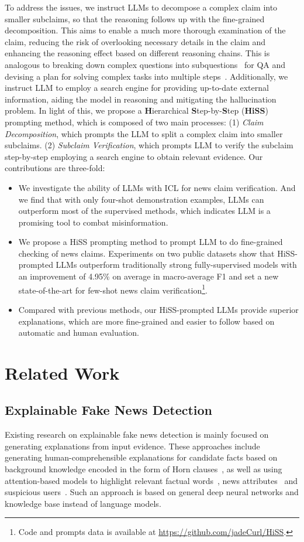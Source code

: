 \documentclass[11pt]{article}
\begin{document}
To address the issues, we instruct LLMs to decompose a complex claim into smaller subclaims, so that the reasoning follows up with the fine-grained decomposition. This aims to enable a much more thorough examination of the claim, reducing the risk of overlooking necessary details in the claim and enhancing the reasoning effect based on different reasoning chains. This is analogous to breaking down complex questions into subquestions~\cite{press2022measuring} for QA and devising a plan for solving complex tasks into multiple steps~\cite{wang2023plan}.
Additionally, we instruct LLM to employ a search engine for providing up-to-date external information, aiding the model in reasoning and mitigating the hallucination problem.
In light of this, we propose a \textbf{H}ierarchical \textbf{S}tep-by-\textbf{S}tep (\textbf{HiSS}) prompting method, which is composed of two main processes: (1) \textit{Claim Decomposition}, which prompts the LLM to split a complex claim into smaller subclaims.
(2) \textit{Subclaim Verification}, which prompts LLM to verify the subclaim step-by-step employing a search engine to obtain relevant evidence. Our contributions are three-fold:
\begin{itemize}[leftmargin=*]
    \item We investigate the ability of LLMs with ICL for news claim verification. And we find that with only four-shot demonstration examples, LLMs can outperform most of the supervised methods, which indicates LLM is a promising tool to combat misinformation.
    \item We propose a HiSS prompting method to prompt LLM to do fine-grained checking of news claims. Experiments on two public datasets show that HiSS-prompted LLMs outperform traditionally strong fully-supervised models with an improvement of 4.95\% on average in macro-average F1 and set a new state-of-the-art for few-shot news claim verification\footnote{Code and prompts data is available at \url{https://github.com/jadeCurl/HiSS}.}.
    \item Compared with previous methods, our HiSS-prompted LLMs provide superior explanations, which are more fine-grained and easier to follow based on automatic and human evaluation.
\end{itemize}

\section{Related Work}
\subsection{Explainable Fake News Detection}
Existing research on explainable fake news detection is mainly focused on generating explanations from input evidence. These approaches include generating human-comprehensible explanations for candidate facts based on background knowledge
encoded in the form of Horn clauses~\cite{gad2019exfakt}, as well as using attention-based models to highlight relevant factual words~\cite{popat2018declare}, news attributes~\cite{yang2019xfake} and suspicious users~\cite{lu2020gcan}. Such an approach is based on general deep neural networks and knowledge base instead of language models. 
\end{document}
